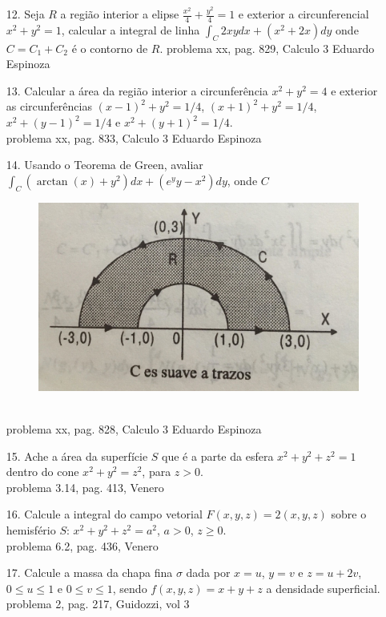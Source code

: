 \begin{itemize}
	\item [12.] Seja $R$ a região interior a elipse $\frac{x^{2}}{4}+\frac{y^{2}}{4}=1$ e exterior a circunferencial $x^{2}+y^{2}=1$, calcular a integral de linha $\int_{C} 2xydx + (x^{2}+2x)dy$ onde $C=C_{1}+C_{2}$ é o contorno de $R$.
	problema xx, pag. 829, Calculo 3 Eduardo Espinoza   	
\end{itemize}
\begin{itemize}
	\item [13.]  Calcular a área da região interior a circunferência $x^{2}+y^{2}=4$ e exterior as circunferências $(x-1)^{2}+y^{2}=1/4$, $(x+1)^{2}+y^{2}=1/4$, $x^{2}+(y-1)^{2}=1/4$ e $x^{2}+(y+1)^{2}=1/4$. \\
	problema xx, pag. 833, Calculo 3 Eduardo Espinoza 
\end{itemize}
\begin{itemize}
	\item [14.] Usando o Teorema de Green, avaliar $\int_{C} (\arctan (x)+y^{2})dx + (e^{y}y-x^{2})dy$, onde $C$ 
	\begin{figure}[!h]
		\begin{center}		
			\includegraphics[width=0.6\linewidth,angle=0]{Figura1.jpg}
		\end{center}
	\end{figure}\\
    problema xx, pag. 828, Calculo 3 Eduardo Espinoza
\end{itemize}
\begin{itemize}
	\item [15.] Ache a área da superfície $S$ que é a parte da esfera $x^{2}+y^{2}+z^{2}=1$ dentro do cone $x^{2}+y^{2}=z^{2}$, para $z>0$.\\
	problema 3.14, pag. 413, Venero
\end{itemize}
\begin{itemize}
	\item [16.] Calcule a integral do campo vetorial $F(x,y,z)= 2(x,y,z)$ sobre o hemisfério $S$: $x^{2}+y^{2}+z^{2}=a^{2}$, $a>0$, $z\geqslant 0$.\\
	problema 6.2, pag. 436, Venero 
\end{itemize}
\begin{itemize}
	\item [17.] Calcule a massa da chapa fina $\sigma$ dada por $x=u$, $y=v$ e $z=u+2v$, $0\leqslant u\leqslant 1$ e $0\leqslant v\leqslant1$, sendo $f(x,y,z)=x+y+z$ a densidade superficial.\\
	problema 2, pag. 217, Guidozzi, vol 3
\end{itemize}

